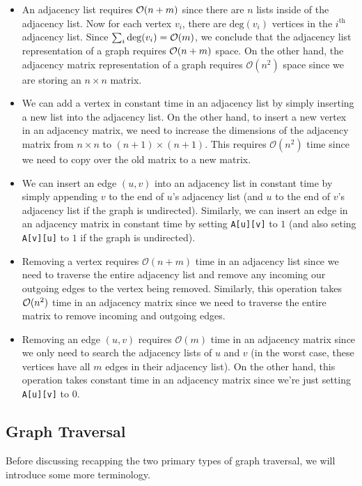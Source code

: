 \begin{itemize}
    \item An adjacency list requires $\mathcal{O}(n + m)$ since there are $n$ lists inside of the adjacency list. Now for each vertex $v_i$, there are $\text{deg}(v_i)$ vertices in the $i^{\text{th}}$ adjacency list. Since $\sum_{i} \text{deg}(v_i) = \mathcal{O}(m)$, we conclude that the adjacency list representation of a graph requires $\mathcal{O}(n + m)$ space. On the other hand, the adjacency matrix representation of a graph requires $\mathcal{O}(n^2)$ space since we are storing an $n\times n$ matrix. 
    \item We can add a vertex in constant time in an adjacency list by simply inserting a new list into the adjacency list. On the other hand, to insert a new vertex in an adjacency matrix, we need to increase the dimensions of the adjacency matrix from $n\times n$ to $(n + 1) \times (n + 1)$. This requires $\mathcal{O}(n^2)$ time since we need to copy over the old matrix to a new matrix.
    \item We can insert an edge $(u, v)$ into an adjacency list in constant time by simply appending $v$ to the end of $u$'s adjacency list (and $u$ to the end of $v$'s adjacency list if the graph is undirected). Similarly, we can insert an edge in an adjacency matrix in constant time by setting \verb!A[u][v]! to $1$ (and also seting \verb!A[v][u]! to $1$ if the graph is undirected). 
    \item Removing a vertex requires $\mathcal{O}(n + m)$ time in an adjacency list since we need to traverse the entire adjacency list and remove any incoming our outgoing edges to the vertex being removed. Similarly, this operation takes $\mathcal{O}(n^2)$ time in an adjacency matrix since we need to traverse the entire matrix to remove incoming and outgoing edges.
    \item Removing an edge $(u, v)$ requires $\mathcal{O}(m)$ time in an adjacency matrix since we only need to search the adjacency lists of $u$ and $v$ (in the worst case, these vertices have all $m$ edges in their adjacency list). On the other hand, this operation takes constant time in an adjacency matrix since we're just setting \verb!A[u][v]! to $0$.
\end{itemize}


\subsection{Graph Traversal}

Before discussing recapping the two primary types of graph traversal, we will introduce some more terminology. \\

